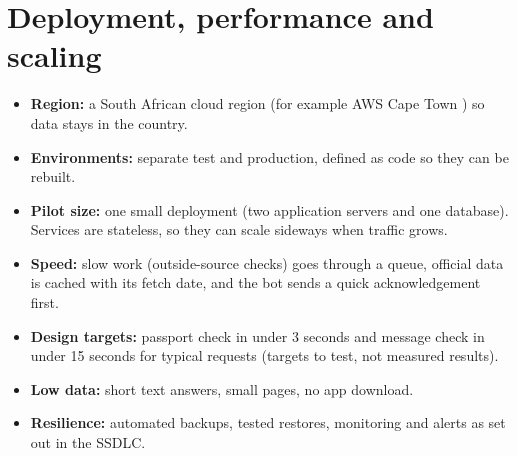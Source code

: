 \documentclass[11pt,a4paper]{article}
\begin{document}
\section{Deployment, performance and scaling}
\begin{itemize}
  \item \textbf{Region:} a South African cloud region (for example AWS Cape Town \cite{aws}) so data stays in the country.
  \item \textbf{Environments:} separate test and production, defined as code so they can be rebuilt.
  \item \textbf{Pilot size:} one small deployment (two application servers and one database). Services are stateless, so they can scale sideways when traffic grows.
  \item \textbf{Speed:} slow work (outside-source checks) goes through a queue, official data is cached with its fetch date, and the bot sends a quick acknowledgement first.
  \item \textbf{Design targets:} passport check in under 3 seconds and message check in under 15 seconds for typical requests (targets to test, not measured results).
  \item \textbf{Low data:} short text answers, small pages, no app download.
  \item \textbf{Resilience:} automated backups, tested restores, monitoring and alerts as set out in the SSDLC.
\end{itemize}

\end{document}
